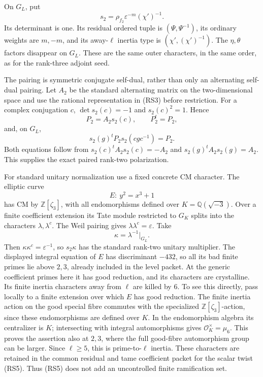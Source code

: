 On \(G_L\), put
\[
             s_2=\rho_{f_2}\varepsilon^{-m}(\chi')^{-1}.
                                                               \tag{RS3}
\]
Its determinant is one.
Its residual ordered tuple is
\((\Psi,\Psi^{-1})\), its ordinary weights
are \(m,-m\), and its away-\(\ell\) inertia
type is \((\chi',(\chi')^{-1})\).
The \(\eta,\theta\) factors disappear on \(G_L\).
These are the same outer characters, in the
same order, as for the rank-three adjoint seed.

The pairing is symmetric conjugate self-dual,
rather than only an alternating self-dual
pairing.
Let \(A_2\) be the standard alternating
matrix on the two-dimensional space and use
the rational representation in (RS3)
before restriction.
For a complex conjugation \(c\),
\(\det s_2(c)=-1\) and \(s_2(c)^2=1\).
Hence
\[
                      P_2=A_2s_2(c),\qquad P_2^t=P_2 ,
\]
and, on \(G_L\),
\[
                    s_2(g)^tP_2s_2(cgc^{-1})=P_2 .
                                                               \tag{RS4}
\]
Both equations follow from
\(s_2(c)^tA_2s_2(c)=-A_2\) and
\(s_2(g)^tA_2s_2(g)=A_2\).
This supplies the exact paired rank-two
polarization.

For standard unitary normalization use a
fixed concrete CM character.
The elliptic curve
\[
                               E:\ y^2=x^3+1
\]
has CM by \(\mathbb Z[\zeta_3]\), with all
endomorphisms defined over
\(K=\mathbb Q(\sqrt{-3})\).
Over a finite coefficient extension its
Tate module restricted to \(G_K\) splits
into the characters \(\lambda,\lambda^c\).
The Weil pairing gives
\(\lambda\lambda^c=\varepsilon\).
Take
\[
                              \kappa=\lambda^{-1}|_{G_L}.
                                                               \tag{RS5}
\]
Then
\(\kappa\kappa^c=\varepsilon^{-1}\),
so \(s_2\kappa\) has the standard rank-two
unitary multiplier.
The displayed integral equation of \(E\)
has discriminant \(-432\), so all its
bad finite primes lie above \(2,3\),
already included in the level packet.
At the generic coefficient primes here it
has good reduction, and its characters are
crystalline.
Its finite inertia characters away from
\(\ell\) are killed by \(6\).
To see this directly, pass locally to a finite
extension over which \(E\) has good reduction.
The finite inertia action on the good special
fibre commutes with the specialized
\(\mathbb Z[\zeta_3]\)-action, since these
endomorphisms are defined over \(K\).
In the endomorphism algebra its centralizer is
\(K\); intersecting with integral automorphisms
gives \(\mathcal O_K^\times=\mu_6\).
This proves the assertion also at \(2,3\),
where the full good-fibre automorphism group
can be larger.
Since \(\ell\ge5\), this is prime-to-\(\ell\)
inertia.
These characters are retained in the common
residual and tame coefficient packet for the
scalar twist (RS5).
Thus (RS5) does not add an uncontrolled
finite ramification set.

